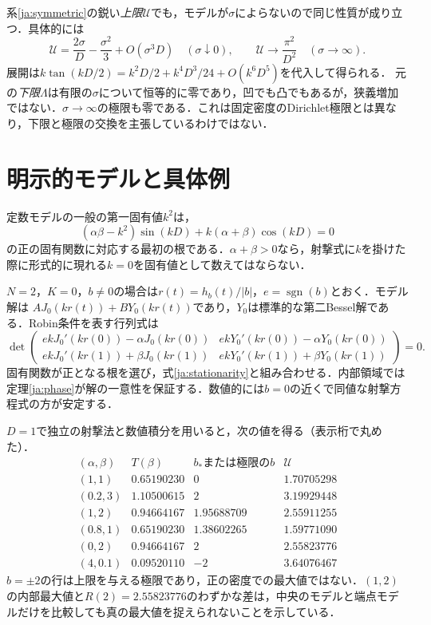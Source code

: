 \documentclass[12pt]{amsart}
\theoremstyle{definition}
\theoremstyle{remark}
\numberwithin{equation}{section}
\begin{document}
系\ref{ja:symmetric}の鋭い\emph{上限}$\mathcal U$でも，モデルが$\sigma$によらないので同じ性質が成り立つ．具体的には
\[
 \mathcal U=\frac{2\sigma}{D}-\frac{\sigma^2}{3}+O(\sigma^3D)
 \quad(\sigma\downarrow0),\qquad
 \mathcal U\longrightarrow\frac{\pi^2}{D^2}\quad(\sigma\to\infty).
\]
展開は$k\tan(kD/2)=k^2D/2+k^4D^3/24+O(k^6D^5)$を代入して得られる．
元の\emph{下限}$\Lambda$は有限の$\sigma$について恒等的に零であり，凹でも凸でもあるが，狭義増加ではない．$\sigma\to\infty$の極限も零である．これは固定密度のDirichlet極限とは異なり，下限と極限の交換を主張しているわけではない．

\section{明示的モデルと具体例}
定数モデルの一般の第一固有値$k^2$は，
\[
 (\alpha\beta-k^2)\sin(kD)+k(\alpha+\beta)\cos(kD)=0
\]
の正の固有関数に対応する最初の根である．$\alpha+\beta>0$なら，射撃式に$k$を掛けた際に形式的に現れる$k=0$を固有値として数えてはならない．

$N=2$，$K=0$，$b\ne0$の場合は$r(t)=h_b(t)/|b|$，$e=\operatorname{sgn}(b)$とおく．モデル解は
$A J_0(kr(t))+B Y_0(kr(t))$であり，$Y_0$は標準的な第二Bessel解である．Robin条件を表す行列式は
\[
\det\begin{pmatrix}
e kJ_0'(kr(0))-\alpha J_0(kr(0))&e kY_0'(kr(0))-\alpha Y_0(kr(0))\\
e kJ_0'(kr(1))+\beta J_0(kr(1))&e kY_0'(kr(1))+\beta Y_0(kr(1))
\end{pmatrix}=0.
\]
固有関数が正となる根を選び，式\eqref{ja:stationarity}と組み合わせる．内部領域では定理\ref{ja:phase}が解の一意性を保証する．数値的には$b=0$の近くで同値な射撃方程式の方が安定する．

$D=1$で独立の射撃法と数値積分を用いると，次の値を得る（表示桁で丸めた）．
\[
\begin{array}{c|c|c|c}
 (\alpha,\beta)&T(\beta)&b_*\text{または極限の}b&\mathcal U\\\hline
 (1,1)&0.65190230&0&1.70705298\\
 (0.2,3)&1.10500615&2&3.19929448\\
 (1,2)&0.94664167&1.95688709&2.55911255\\
 (0.8,1)&0.65190230&1.38602265&1.59771090\\
 (0,2)&0.94664167&2&2.55823776\\
 (4,0.1)&0.09520110&-2&3.64076467
\end{array}
\]
$b=\pm2$の行は上限を与える極限であり，正の密度での最大値ではない．$(1,2)$の内部最大値と$R(2)=2.55823776$のわずかな差は，中央のモデルと端点モデルだけを比較しても真の最大値を捉えられないことを示している．
\end{document}
